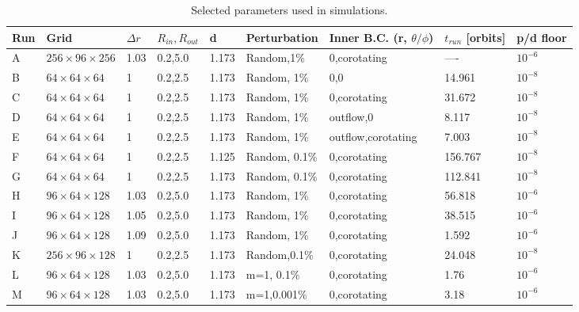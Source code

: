 \documentclass[iop,revtex4]{emulateapj}
\begin{document}
\begin{table}[t]
\centering
    \begin{tabular}{lllllllll}
    \hline
    Run & Grid                   & $\Delta r$ & $R_{in},R_{out}$ & d     & Perturbation & Inner B.C.
(r, $\theta/\phi$) & $t_{run}$ [orbits] & p/d floor \\ \hline
    A & $256\times96\times256$ & 1.03       & 0.2,5.0          & 1.173 & Random,1\%    & 0,corotating                  & ----                 & $10^{-6}$   \\
    B & $64\times64\times64$   & 1          & 0.2,2.5          & 1.173 & Random, 1\%   & 0,0                           & 14.961             & $10^{-8}$   \\
    C & $64\times64\times64$   & 1          & 0.2,2.5          & 1.173 & Random, 1\%   & 0,corotating                  & 31.672             & $10^{-8}$   \\
    D & $64\times64\times64$   & 1          & 0.2,2.5          & 1.173 & Random, 1\%   & outflow,0                     & 8.117              & $10^{-8}$   \\
    E & $64\times64\times64$   & 1          & 0.2,2.5          & 1.173 & Random, 1\%   & outflow,corotating            & 7.003              & $10^{-8}$   \\
    F & $64\times64\times64$   & 1          & 0.2,2.5          & 1.125 & Random, 0.1\% & 0,corotating                  & 156.767            & $10^{-8}$   \\
    G & $64\times64\times64$   & 1          & 0.2,2.5          & 1.173 & Random, 0.1\% & 0,corotating                  & 112.841            & $10^{-8}$   \\
    H & $96\times64\times128$  & 1.03       & 0.2,5.0          & 1.173 & Random, 1\%   & 0,corotating                  & 56.818             & $10^{-6}$   \\
    I & $96\times64\times128$  & 1.05       & 0.2,5.0          & 1.173 & Random, 1\%   & 0,corotating                  & 38.515             & $10^{-6}$   \\
    J & $96\times64\times128$  & 1.09       & 0.2,5.0          & 1.173 & Random, 1\%   & 0,corotating                  & 1.592              & $10^{-6}$   \\
    K & $256\times96\times128$ & 1          & 0.2,2.5          & 1.173 & Random,0.1\%  & 0,corotating                  & 24.048             & $10^{-8}$   \\ 
     L & $96\times64\times128$  & 1.03       & 0.2,5.0          & 1.173 & m=1, 0.1\%   & 0,corotating                  & 1.76               & $10^{-6}$ \\
    M & $96\times64\times128$  & 1.03       & 0.2,5.0          & 1.173 & m=1,0.001\%  & 0,corotating                  & 3.18               & $10^{-6}$ \\ \hline
    \end{tabular}
    \caption{Selected parameters used in simulations.}
 \label{parameters}\end{table}
\end{document}
